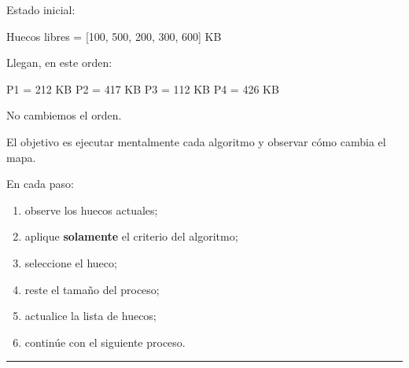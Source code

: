 \documentclass[
  spanish,
  letterpaper,
]{scrbook}
\newenvironment{Shaded}{\begin{snugshade}}{\end{snugshade}}
\newcommand{\NormalTok}[1]{\textcolor[rgb]{0.00,0.23,0.31}{#1}}
\providecommand{\tightlist}{%
  \setlength{\itemsep}{0pt}\setlength{\parskip}{0pt}}
\begin{document}
Estado inicial:

\begin{Shaded}
\begin{Highlighting}[]
\NormalTok{Huecos libres = [100, 500, 200, 300, 600] KB}
\end{Highlighting}
\end{Shaded}

Llegan, en este orden:

\begin{Shaded}
\begin{Highlighting}[]
\NormalTok{P1 = 212 KB}
\NormalTok{P2 = 417 KB}
\NormalTok{P3 = 112 KB}
\NormalTok{P4 = 426 KB}
\end{Highlighting}
\end{Shaded}

No cambiemos el orden.

El objetivo es ejecutar mentalmente cada algoritmo y observar cómo
cambia el mapa.

\begin{tcolorbox}[enhanced jigsaw, arc=.35mm, bottomrule=.15mm, bottomtitle=1mm, breakable, colback=white, colbacktitle=quarto-callout-tip-color!10!white, colframe=quarto-callout-tip-color-frame, coltitle=black, left=2mm, leftrule=.75mm, opacityback=0, opacitybacktitle=0.6, rightrule=.15mm, title=\textcolor{quarto-callout-tip-color}{\faLightbulb}\hspace{0.5em}{Método de trabajo}, titlerule=0mm, toprule=.15mm, toptitle=1mm]

En cada paso:

\begin{enumerate}
\def\labelenumi{\arabic{enumi}.}
\tightlist
\item
  observe los huecos actuales;
\item
  aplique \textbf{solamente} el criterio del algoritmo;
\item
  seleccione el hueco;
\item
  reste el tamaño del proceso;
\item
  actualice la lista de huecos;
\item
  continúe con el siguiente proceso.
\end{enumerate}

\end{tcolorbox}

\begin{center}\rule{0.5\linewidth}{0.5pt}\end{center}

\end{document}
